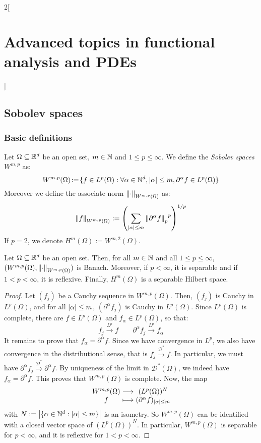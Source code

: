 \documentclass[../../../main_math.tex]{subfiles}
\begin{document}
\begin{multicols}{2}[\section{Advanced topics in functional analysis and PDEs}]
  \subsection{Sobolev spaces}
  \subsubsection{Basic definitions}
  \begin{definition}
    Let $\Omega\subseteq \mathbb{R}^d$ be an open set, $m\in\mathbb{N}$ and $1\leq p\leq \infty$. We define the \emph{Sobolev spaces} $W^{m,p}$ as:
    $$
      W^{m,p}(\Omega)\!:=\!\{f\in L^p(\Omega): \forall\alpha\in\mathbb{N}^d, \abs{\alpha}\leq m, \partial^\alpha f\in L^p(\Omega)\}
    $$
    Moreover we define the associate norm $\left\|\cdot\right\|_{W^{m,p}(\Omega)}$ as:
    $$
      \left\|f\right\|_{W^{m,p}(\Omega)}:={\left(\sum_{\abs{\alpha}\leq m}{\left\|\partial^\alpha f\right\|_p}^p\right)}^{1/p}
    $$
    If $p=2$, we denote $H^m(\Omega):=W^{m,2}(\Omega)$.
  \end{definition}
  \begin{theorem}
    Let $\Omega\subseteq \mathbb{R}^d$ be an open set. Then, for all $m\in\mathbb{N}$ and all $1\leq p\leq \infty$, $(W^{m,p}(\Omega),\left\|\cdot\right\|_{W^{m,p}(\Omega)})$ is Banach. Moreover, if $p<\infty$, it is separable and if $1<p<\infty$, it is reflexive. Finally, $H^m(\Omega)$ is a separable Hilbert space.
  \end{theorem}
  \begin{proof}
    Let $(f_j)$ be a Cauchy sequence in $W^{m,p}(\Omega)$. Then, $(f_j)$ is Cauchy in $L^p(\Omega)$, and for all $\abs{\alpha}\leq m$, $(\partial^\alpha f_j)$ is Cauchy in $L^p(\Omega)$. Since $L^p(\Omega)$ is complete, there are $f\in L^p(\Omega)$ and $f_\alpha\in L^p(\Omega)$, so that:
    $$
      f_j\overset{L^p}\longrightarrow f\qquad\partial^\alpha f_j\overset{L^p}\longrightarrow f_\alpha
    $$
    It remains to prove that $f_\alpha=\partial^\alpha f$. Since we have convergence in $L^p$, we also have convergence in the distributional sense, that is $f_j\overset{\mathcal{D}^*}\to f$. In particular, we must have $\partial^\alpha f_j\overset{\mathcal{D}^*}\to \partial^\alpha f$. By uniqueness of the limit in $\mathcal{D}^*(\Omega)$, we indeed have $f_\alpha=\partial^\alpha f$. This proves that $W^{m,p}(\Omega)$ is complete. Now, the map
    $$
      \function{}{W^{m,p}(\Omega)}{(L^p(\Omega))^N}{f}{(\partial^\alpha f)_{\abs{\alpha}\leq m}}
    $$
    with $N:=\abs{\{\alpha\in\mathbb{N}^d:\abs{\alpha}\leq m\}}$ is an isometry. So $W^{m,p}(\Omega)$ can be identified with a closed vector space of $(L^p(\Omega))^N$. In particular, $W^{m,p}(\Omega)$ is separable for $p<\infty$, and it is reflexive for $1<p<\infty$.

\end{proof}
\end{multicols}
\end{document}
